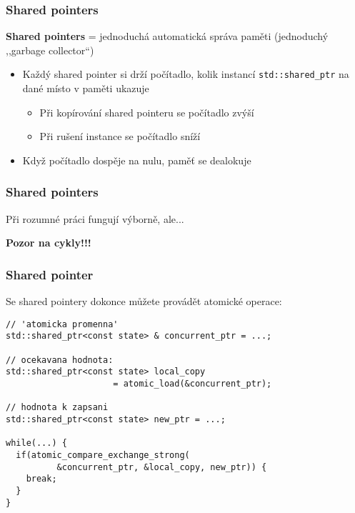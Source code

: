 \documentclass[usenames,dvipsnames,9pt]{beamer}
\begin{document}
\begin{frame}
  \frametitle{Shared pointers}

  \textbf{Shared pointers} = jednoduchá automatická správa paměti (jednoduchý ,,garbage collector``)

  \begin{itemize}
  	\item Každý shared pointer si drží počítadlo, kolik instancí \texttt{std::shared\_ptr} na dané místo v paměti ukazuje
  	      \begin{itemize}
  	      	\item Při kopírování shared pointeru se počítadlo zvýší
  	      	\item Při rušení instance se počítadlo sníží
  	      \end{itemize}
  	\item Když počítadlo dospěje na nulu, paměť se dealokuje
  \end{itemize}
\end{frame}

\begin{frame}
  \frametitle{Shared pointers}

  Při rozumné práci fungují výborně, ale...

  \begin{center}
  	\LARGE \bf \faWarning \hspace{6pt} Pozor na cykly!!!
  \end{center}

  \vspace{1em}
  \begin{center}
  \end{center}
\end{frame}

\begin{frame}[fragile]
  \frametitle{Shared pointer}

  Se shared pointery dokonce můžete provádět atomické operace:
  \begin{verbatim}
// 'atomicka promenna'
std::shared_ptr<const state> & concurrent_ptr = ...;

// ocekavana hodnota:
std::shared_ptr<const state> local_copy
                     = atomic_load(&concurrent_ptr);

// hodnota k zapsani
std::shared_ptr<const state> new_ptr = ...;

while(...) {
  if(atomic_compare_exchange_strong(
          &concurrent_ptr, &local_copy, new_ptr)) {
    break;
  }
}
  \end{verbatim}
\end{frame}
\end{document}

